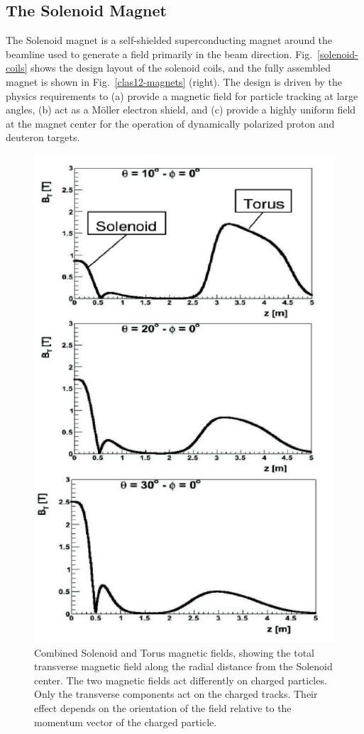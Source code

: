 \documentclass[final,3p,twocolumn]{elsarticle}
\begin{document}
\subsection{The Solenoid Magnet}

The Solenoid magnet is a self-shielded superconducting magnet around the beamline used to generate a field primarily
in the beam direction. Fig.~\ref{solenoid-coils} shows the design layout of the solenoid coils, and the fully assembled
magnet is shown in Fig.~\ref{clas12-magnets} (right). The design is driven by the physics requirements to (a) provide
a magnetic field for particle tracking at large angles, (b) act as a M\"oller electron shield, and (c) provide a highly
uniform field at the magnet center for the operation of dynamically polarized proton and deuteron targets.
\begin{figure}[htbp!]
\centerline{\includegraphics[width=0.65\columnwidth]{magfield.png}}
\caption{Combined Solenoid and Torus magnetic fields, showing the total transverse magnetic field along the radial
distance from the Solenoid center. The two magnetic fields act differently on charged particles. Only the transverse
components act on the charged tracks. Their effect depends on the orientation of the field relative to the momentum
vector of the charged particle.} 

\end{figure}
\end{document}
